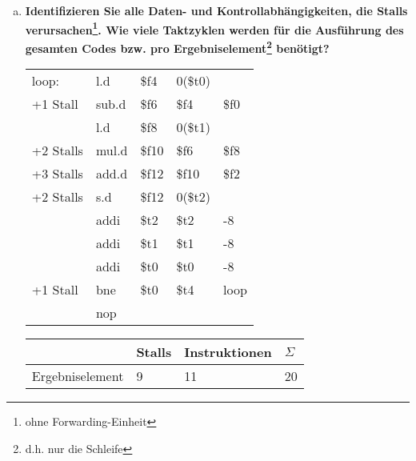 \begin{enumerate}[(a)]
	\item \textbf{Identifizieren Sie alle Daten- und Kontrollabhängigkeiten, die Stalls	verursachen\footnote{ohne Forwarding-Einheit}. Wie viele Taktzyklen werden für die
	Ausführung des gesamten Codes bzw. pro Ergebniselement\footnote{d.h. nur die Schleife}
	benötigt?}

	{
		\ttfamily
		\begin{tabular}{l llll}
			loop:                       & l.d   & \color{blue}\$f4        & 0(\$t0)               &                  \\
			\color{blue} +1 Stall       & sub.d & \color{brown}\$f6       & \color{blue}\$f4      & \$f0             \\
			                            & l.d   & \color{cyan}\$f8        & 0(\$t1)               &                  \\
			\color{brown}+2 Stalls      & mul.d & \color{Mulberry}\$f10   & \color{brown}\$f6     & \color{cyan}\$f8 \\
			\color{Mulberry}+3 Stalls   & add.d & \color{Orange}\$f12     & \color{Mulberry}\$f10 & \$f2             \\
			\color{Orange}+2 Stalls     & s.d   & \color{Orange}\$f12     & 0(\$t2)               &                  \\
			                            & addi  & \$t2                    & \$t2                  & -8               \\
			                            & addi  & \$t1                    & \$t1                  & -8               \\
			                            & addi  & \color{Bittersweet}\$t0 & \$t0                  & -8               \\
			\color{Bittersweet}+1 Stall & bne   & \color{Bittersweet}\$t0 & \$t4                  & loop             \\
			                            & nop   &                         &                       &
		\end{tabular}
	}
	\begin{tabular}{llll}
		\hline
		                & Stalls & Instruktionen & $ \Sigma $ \\ \hline
		Ergebniselement & 9      & 11            & 20         \\ \hline
	\end{tabular}
\end{enumerate}